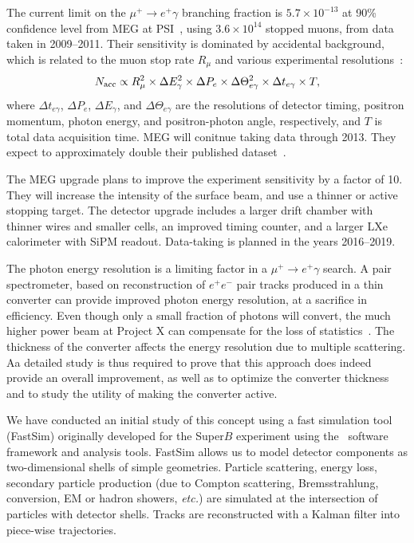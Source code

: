 
The current limit on the $\mu^+\to e^+ \gamma$ branching fraction is 
$5.7\times 10^{-13}$ at 90\% confidence level from MEG at 
PSI~\cite{Adam:2013mnn}, using 
$3.6\times 10^{14}$ stopped muons, from data taken in 2009--2011. 
Their sensitivity is dominated by 
accidental background, which is related to the muon stop rate
$R_\mu$ and various experimental resolutions~\cite{Baldini:2013ke}:
\begin{equation}
N_{\rm acc} \propto R_{\mu}^2 \times \Delta E_\gamma^2 \times \Delta P_e 
\times \Delta \Theta^2_{e\gamma} \times \Delta t_{e\gamma} \times T ,
\end{equation}
where $\Delta t_{e\gamma}$, $\Delta P_e$, 
$\Delta E_\gamma$, and $\Delta\Theta_{e\gamma}$ are the resolutions of 
detector timing, positron momentum, photon energy, and positron-photon angle,
respectively, and $T$ is total data acquisition time. MEG will conitnue 
taking data through 2013. They expect to
approximately double their published dataset~\cite{G.Lim's talk at Argonne}.

The MEG upgrade plans to improve the experiment sensitivity by a factor of 10. 
They will increase the intensity of the surface beam, and use a thinner or
active stopping target. The detector upgrade includes a larger drift chamber with
thinner wires and smaller cells, an improved timing counter, and a larger LXe
calorimeter with SiPM readout. Data-taking is planned in the years 2016--2019.

The photon energy
resolution is a limiting factor in a $\mu^+\to e^+ \gamma$ search.  A pair spectrometer, based on reconstruction of $e^+e^-$ pair tracks produced in a
thin converter can provide improved photon energy resolution, at a sacrifice in efficiency. Even though only a small fraction of photons will convert,
the much higher power beam at Project X can
compensate for the loss of statistics~\cite{Fritz:2012aaa}. The thickness of the converter affects the energy 
resolution due to multiple scattering. Aa detailed study is thus required to prove that this approach does indeed provide an overall
improvement, as well as to optimize the converter thickness and to study the utility of making the converter active.

We have conducted an initial study of this concept using a fast simulation tool
(FastSim) originally developed for the Super$B$ experiment using the  \babar\ software
framework and analysis tools. FastSim allows us to model detector components
as two-dimensional shells of simple geometries. Particle scattering, energy
loss, secondary particle production (due to Compton scattering, Bremsstrahlung,
conversion, EM or hadron showers, {\it etc.}) are simulated at the intersection
of particles with detector shells. Tracks are reconstructed with a Kalman filter
into piece-wise trajectories. 


